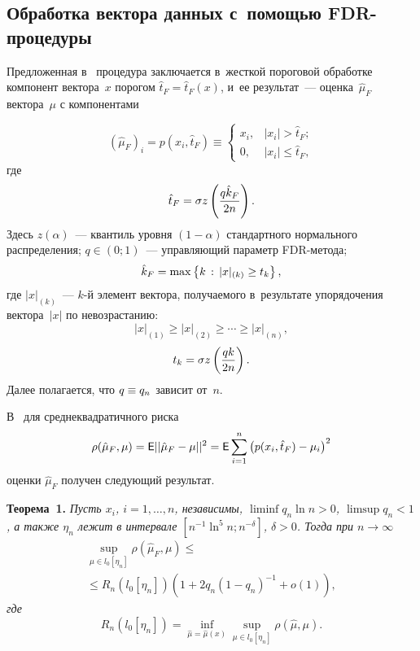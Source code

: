 \begin{multicols}{2}
\section{Обработка вектора данных с~помощью FDR-процедуры}

Предложенная в~\cite{AdaptingFDR} процедура заключается в~жесткой пороговой 
обработке компонент вектора~$x$ порогом $\hat{t}_F = \hat{t}_F(x)$, и~ее 
результат~--- оценка~$\hat{\mu}_F$ вектора~$\mu$ с компонентами

\noindent
\begin{equation*}
(\hat{\mu}_F)_i  = p(x_i,\hat{t}_F) \equiv
 \begin{cases}
   x_i, & |x_i| > \hat{t}_F;\\
   0, & |x_i| \leq \hat{t}_F,
 \end{cases}
\end{equation*}
где
$$
\hat{t}_F = \sigma z\left(\displaystyle\frac{\displaystyle q \hat{k}_F\mathstrut}{\displaystyle 2n\mathstrut}\right).
$$
Здесь
$z(\alpha)$~--- квантиль уровня $(1-\alpha)$ стандартного нормального 
распределения; $q\in(0;1)$~--- управ\-ля\-ющий па\-ра\-метр FDR-ме\-то\-да;
$$
\hat{k}_F \hm= \max \left\{k \, :\, |x|_{(k)} \geq t_k \right\}, 
$$
где
$|x|_{(k)}$~--- $k$-й элемент вектора, получаемого в~результате 
упорядочения вектора~$|x|$ по невозрастанию:
$$
|x|_{(1)} \geq |x|_{(2)} \geq \cdots \geq |x|_{(n)},
$$
$$
 t_k = \sigma z\left(\displaystyle\frac{\displaystyle q  k\mathstrut}{\displaystyle 2n\mathstrut}\right).
$$
 Далее полагается, что $q\hm\equiv q_n$ зависит от~$n$.

В~\cite{AdaptingFDR} для среднеквадратичного риска
$$
\rho(\hat{\mu}_F, \mu) = {\sf E} ||\hat{\mu}_F-\mu||^2 = {\sf E}\sum\limits_{i=1}^n 
\left(p(x_i,\hat{t}_F)-\mu_i\right)^2
$$
оценки $\hat{\mu}_F$ получен сле\-ду\-ющий результат.


\smallskip

\noindent
\textbf{Теорема~1.}
\textit{Пусть $x_i$, $i=1,\ldots,n$, независимы, $\liminf q_n \ln n > 0$, $\limsup q_n 
<1$, а также $\eta_n$ лежит в интервале $[n^{-1}\ln^5 n; n^{-\delta}]$, 
$\delta>0$. Тогда при $n\to\infty$}
\begin{multline*}
\sup\limits_{\mu\in l_0[\eta_n]}\rho(\hat{\mu}_F, \mu)  \leq {}\\
{}\leq
R_n(l_0[\eta_n])\left(1+2 q_n(1-q_n)^{-1}+o(1)\right),
\end{multline*}
\textit{где}
\begin{equation*}
R_n(l_0[\eta_n]) = \inf\limits_{\hat{\mu}=\hat{\mu}(x)} \sup\limits_{\mu\in 
l_0[\eta_n]}\rho(\hat{\mu}, \mu).
\end{equation*}




\end{multicols}
